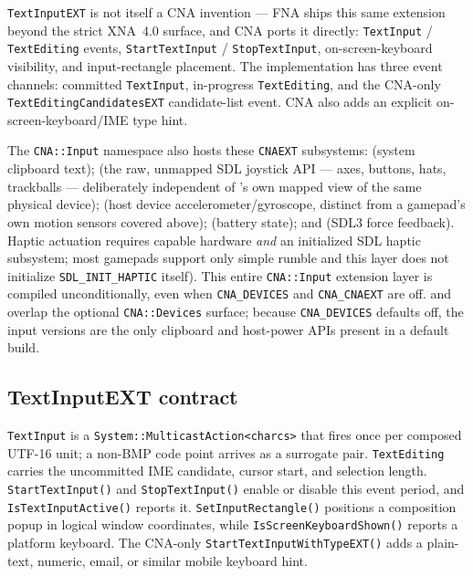 \texttt{TextInputEXT} is not itself a CNA invention --- FNA ships this same extension beyond
the strict XNA~4.0 surface, and CNA ports it directly: \texttt{TextInput} / \texttt{TextEditing}
events, \texttt{StartTextInput} / \texttt{StopTextInput}, on-screen-keyboard visibility, and
input-rectangle placement. The implementation has three event channels: committed
\texttt{TextInput}, in-progress \texttt{TextEditing}, and the CNA-only
\texttt{TextEditingCandidatesEXT} candidate-list event. CNA also adds an explicit
on-screen-keyboard/IME type hint.

The \texttt{CNA::Input} namespace also hosts these \texttt{CNAEXT} subsystems:
 (system clipboard text);  (the raw, unmapped SDL
joystick API --- axes, buttons, hats, trackballs --- deliberately independent of
's own mapped view of the same physical device);  (host
device accelerometer/gyroscope, distinct from a gamepad's own motion sensors covered above);
 (battery state); and  (SDL3 force feedback). Haptic actuation
requires capable hardware
\emph{and} an initialized SDL haptic subsystem; most gamepads support only simple
rumble and this layer does not initialize \texttt{SDL\_INIT\_HAPTIC} itself).
This entire \texttt{CNA::Input} extension layer is compiled unconditionally, even when
\texttt{CNA\_DEVICES} and \texttt{CNA\_CNAEXT} are off.  and
 overlap the optional \texttt{CNA::Devices} surface; because
\texttt{CNA\_DEVICES} defaults off, the input versions are the only clipboard and host-power
APIs present in a default build.

\subsection{TextInputEXT contract}

\texttt{TextInput} is a \texttt{System::MulticastAction<charcs>} that fires once per composed
UTF-16 unit; a non-BMP code point arrives as a surrogate pair. \texttt{TextEditing} carries the
uncommitted IME candidate, cursor start, and selection length. \texttt{StartTextInput()} and
\texttt{StopTextInput()} enable or disable this event period, and
\texttt{IsTextInputActive()} reports it. \texttt{SetInputRectangle()} positions a composition
popup in logical window coordinates, while \texttt{IsScreenKeyboardShown()} reports a platform
keyboard. The CNA-only \texttt{StartTextInputWithTypeEXT()} adds a plain-text, numeric, email,
or similar mobile keyboard hint.

